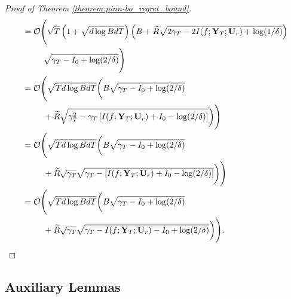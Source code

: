 \begin{proof}[Proof of Theorem \ref{theorem:pinn-bo_regret_bound}]
\begin{align*}
    &= \mathcal{O}\Bigg( \sqrt{T} \left(1 +  \sqrt{d\log BdT}\right) \left(B + \widetilde{R}\sqrt{2\gamma_T - 2I(f;\mathbf{Y}_T; \mathbf{U}_r)+\log(1/\delta)} \right) \notag 
    \\
    & \;\;\;\;\;\;\;\;\; \sqrt{\gamma_T - I_0 + \log(2/\delta)}   \Bigg) 
    \\
    &= \mathcal{O}\Bigg( \sqrt{T d\log BdT} \bigg(B \sqrt{\gamma_T - I_0 + \log(2/\delta)} 
    \\
    & \;\;\;\;\;\;\;\;\; + \widetilde{R}\sqrt{\gamma_T^2 - \gamma_T \left[I(f;\mathbf{Y}_T; \mathbf{U}_r) + I_0 -\log(2/\delta)\right]} \bigg) \Bigg) 
    \\
    &= \mathcal{O}\Bigg( \sqrt{T d\log BdT} \bigg(B \sqrt{\gamma_T - I_0 + \log(2/\delta)} \notag 
    \\
    & \;\;\;\;\;\;\;\;\; + \widetilde{R}\sqrt{\gamma_T}\sqrt{\gamma_T - \left[I(f;\mathbf{Y}_T; \mathbf{U}_r) + I_0 -\log(2/\delta)\right]} \bigg) \Bigg)
    \\
    &= \mathcal{O}\Bigg( \sqrt{T d\log BdT} \bigg(B \sqrt{\gamma_T - I_0 + \log(2/\delta)} \notag 
    \\
    & \;\;\;\;\;\;\;\;\; +  \widetilde{R}\sqrt{\gamma_T}\sqrt{\gamma_T - I(f;\mathbf{Y}_T; \mathbf{U}_r) - I_0 +\log(2/\delta)} \bigg) \Bigg).
\end{align*}
\end{proof}


\subsection{Auxiliary Lemmas}

